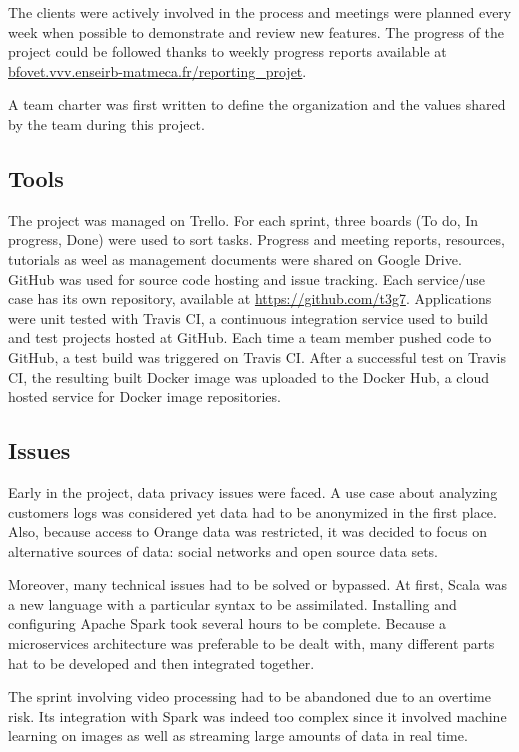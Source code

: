 \documentclass[11pt]{article}
\begin{document}
The clients were actively involved in the process and meetings were planned every week when possible to demonstrate and review new features. The progress of the project could be followed thanks to weekly progress reports available at \url{bfovet.vvv.enseirb-matmeca.fr/reporting_projet}.

A team charter was first written to define the organization and the values shared by the team during this project.

\subsection{Tools}

The project was managed on \textsf{Trello}. For each sprint, three boards (To do, In progress, Done) were used to sort tasks.
Progress and meeting reports, resources, tutorials as weel as management documents were shared on \textsf{Google Drive}.
\textsf{GitHub} was used for source code hosting and issue tracking. Each service/use case has its own repository, available at \url{https://github.com/t3g7}.
Applications were unit tested with \textsf{Travis CI}, a continuous integration service used to build and test projects hosted at \textsf{GitHub}. Each time a team member pushed code to \textsf{GitHub}, a test build was triggered on \textsf{Travis CI}.
After a successful test on \textsf{Travis CI}, the resulting built \textsf{Docker} image was uploaded to the \textsf{Docker Hub}, a cloud hosted service for \textsf{Docker} image repositories.

\subsection{Issues}

Early in the project, data privacy issues were faced. A use case about analyzing customers logs was considered yet data had to be anonymized in the first place. Also, because access to \textsf{Orange} data was restricted, it was decided to focus on alternative sources of data: social networks and open source data sets.

Moreover, many technical issues had to be solved or bypassed. At first, \textsf{Scala} was a new language with a particular syntax to be assimilated. Installing and configuring \textsf{Apache Spark} took several hours to be complete. Because a microservices architecture was preferable to be dealt with, many different parts hat to be developed and then integrated together.

The sprint involving video processing had to be abandoned due to an overtime risk. Its integration with \textsf{Spark} was indeed too complex since it involved machine learning on images as well as streaming large amounts of data in real time.
\end{document}
